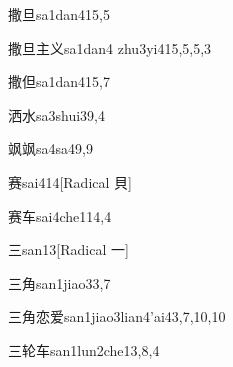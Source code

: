 
\begin{verbete}{撒旦}{sa1dan4}{15,5}
\end{verbete}

\begin{verbete}{撒旦主义}{sa1dan4 zhu3yi4}{15,5,5,3}
\end{verbete}

\begin{verbete}{撒但}{sa1dan4}{15,7}
\end{verbete}

\begin{verbete}{洒水}{sa3shui3}{9,4}
\end{verbete}

\begin{verbete}{飒飒}{sa4sa4}{9,9}
\end{verbete}

\begin{verbete}{赛}{sai4}{14}[Radical 貝]
\end{verbete}

\begin{verbete}{赛车}{sai4che1}{14,4}
\end{verbete}

\begin{verbete}{三}{san1}{3}[Radical 一]
\end{verbete}

\begin{verbete}{三角}{san1jiao3}{3,7}
\end{verbete}

\begin{verbete}{三角恋爱}{san1jiao3lian4'ai4}{3,7,10,10}
\end{verbete}

\begin{verbete}{三轮车}{san1lun2che1}{3,8,4}
\end{verbete}

